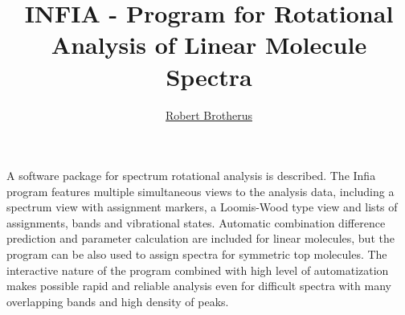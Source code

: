 \documentclass[12pt]{article}
\title{INFIA - Program for Rotational Analysis of Linear Molecule Spectra}
\author{\underline{Robert Brotherus}}
\begin{document}
\maketitle

A software package for spectrum rotational analysis is described. The Infia
program features multiple simultaneous views to the analysis data, including a
spectrum view with assignment markers, a Loomis-Wood type view and lists of
assignments, bands and vibrational states. Automatic combination difference
prediction and parameter calculation are included for linear molecules, but
the program can be also used to assign spectra for symmetric top molecules.
The interactive nature of the program combined with high level of
automatization makes possible rapid and reliable analysis even for difficult
spectra with many overlapping bands and high density of peaks.
\end{document}
